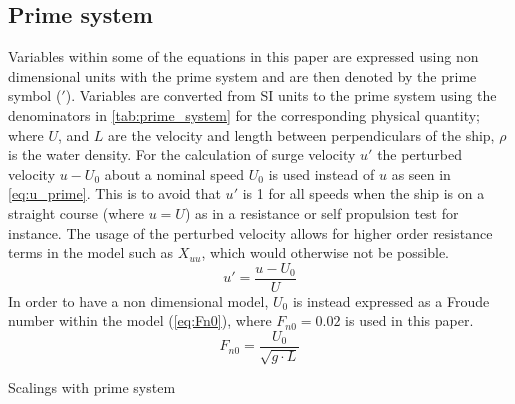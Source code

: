 \subsection{Prime system}
\label{sec:prime_system}
Variables within some of the equations in this paper are expressed using non dimensional units with the prime system and are then denoted by the prime symbol ($'$). Variables are converted from SI units to the prime system using the denominators in \autoref{tab:prime_system} for the corresponding physical quantity; where $U$, and $L$ are the velocity and length between perpendiculars of the ship, $\rho$ is the water density.
For the calculation of surge velocity $u'$ the perturbed velocity $u-U_0$ about a nominal speed $U_0$ is used instead of $u$ as seen in \autoref{eq:u_prime}. This is to avoid that $u'$ is 1 for all speeds when the ship is on a straight course (where $u=U$) as in a resistance or self propulsion test for instance. The usage of the perturbed velocity allows for higher order resistance terms in the model such as $X_{uu}$, which would otherwise not be possible. 
\begin{equation}
    \label{eq:u_prime}
    u' = \frac{u-U_0}{U}
\end{equation}
In order to have a non dimensional model, $U_0$ is instead expressed as a Froude number within the model (\autoref{eq:Fn0}), where $F_{n0}=0.02$ is used in this paper.
\begin{equation}
    \label{eq:Fn0}
    F_{n0} = \frac{U_0}{\sqrt{g \cdot L}}
\end{equation}

\begin{table}[h!]
    \centering
    \caption{Scalings with prime system}
    \label{tab:prime_system}
\end{table}